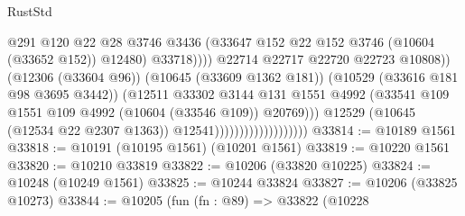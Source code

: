 \begin{lexlean}{RustStd}
\begin{coremodule}
                                                        @291
                                                        @120
                                                        @22
                                                        @28
                                                        @3746
                                                        @3436
                                                        (@33647
                                                          @152
                                                          @22
                                                          @152
                                                          @3746
                                                          (@10604 (@33652 @152))
                                                          @12480)
                                                        @33718))))
                                                @22714
                                                @22717
                                                @22720
                                                @22723
                                                @10808))
                                            (@12306 (@33604 @96))
                                            (@10645 (@33609 @1362 @181))
                                            (@10529 (@33616 @181 @98 @3695 @3442))
                                            (@12511
                                              @33302
                                              @3144
                                              @131
                                              @1551
                                              @4992
                                              (@33541
                                                @109
                                                @1551
                                                @109
                                                @4992
                                                (@10604 (@33546 @109))
                                                @20769)))
                                          @12529
                                          (@10645 (@12534 @22 @2307 @1363))
                                          @12541)))))))))))))))))))
@33814 := @10189 @1561
@33818 := @10191 (@10195 @1561) (@10201 @1561)
@33819 := @10220 @1561
@33820 := @10210 @33819
@33822 := @10206 (@33820 @10225)
@33824 := @10248 (@10249 @1561)
@33825 := @10244 @33824
@33827 := @10206 (@33825 @10273)
@33844 := @10205
    (fun (fn : @89) =>
    @33822
      (@10228

\end{coremodule}
\end{lexlean}
